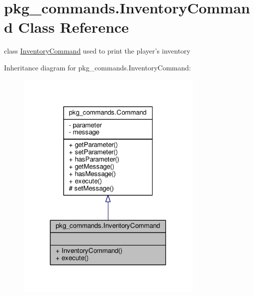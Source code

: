 \hypertarget{classpkg__commands_1_1InventoryCommand}{\section{pkg\-\_\-commands.\-Inventory\-Command Class Reference}
\label{classpkg__commands_1_1InventoryCommand}
}


class \hyperlink{classpkg__commands_1_1InventoryCommand}{Inventory\-Command} used to print the player's inventory  




Inheritance diagram for pkg\-\_\-commands.\-Inventory\-Command\-:\nopagebreak
\begin{figure}[H]
\begin{center}
\leavevmode
\includegraphics[width=254pt]{classpkg__commands_1_1InventoryCommand__inherit__graph}
\end{center}
\end{figure}


